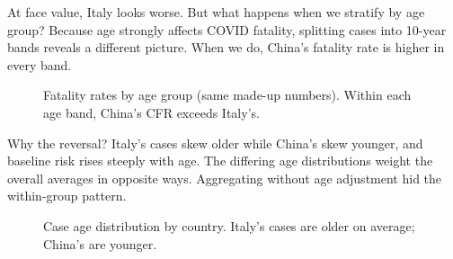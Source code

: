 \documentclass[
  letterpaper,
  DIV=11,
  numbers=noendperiod]{scrreprt}
\begin{document}
At face value, Italy looks worse. But what happens when we stratify by
age group? Because age strongly affects COVID fatality, splitting cases
into 10-year bands reveals a different picture. When we do, China's
fatality rate is higher in every band.

\begin{figure}


\caption{\label{fig-simpson-by-age-group}Fatality rates by age group
(same made-up numbers). Within each age band, China's CFR exceeds
Italy's.}

\end{figure}%

Why the reversal? Italy's cases skew older while China's skew younger,
and baseline risk rises steeply with age. The differing age
distributions weight the overall averages in opposite ways. Aggregating
without age adjustment hid the within-group pattern.

\begin{figure}


\caption{\label{fig-age-distributions}Case age distribution by country.
Italy's cases are older on average; China's are younger.}

\end{figure}%
\end{document}
